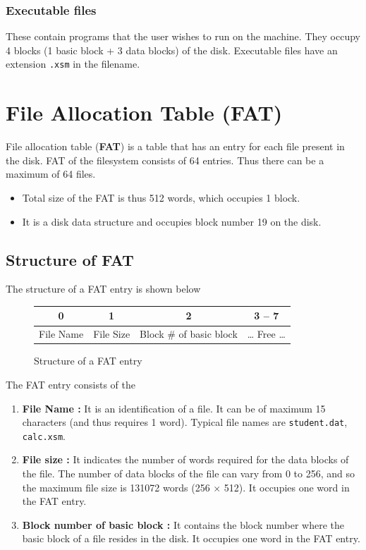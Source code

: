 \documentclass[11pt]{article}
\begin{document}
\subsubsection{Executable files}  These contain programs that the user wishes to run on the machine. They occupy 4 blocks (1 basic block + 3 data blocks) of the disk. Executable files have an extension \texttt{.xsm} in the filename.


\section{File Allocation Table (FAT)}
\label{sec:fat}
\label{lbl:fat}
File allocation table (\textbf{FAT}) is a table that has an entry for each file present in the disk. FAT of the filesystem consists of 64 entries. Thus there can be a maximum of 64 files.

\begin{itemize}
\item Total size of the FAT is thus 512 words, which occupies 1 block.
\item It is a disk data structure and occupies block number 19 on the disk.
\end{itemize}


\subsection{Structure of FAT}


The structure of a FAT entry is shown below 

\begin{figure}[htp!] \small
	\centering
	\begin{tabular}{|c|c|c|c|}
		\hline
		0 & 1 & 2 & 3 -- 7 \\
		\hline
		File Name & File Size & Block \# of basic block & \dots{} Free \dots \\
		\hline
	\end{tabular}
	\caption{Structure of a FAT entry}
	\label{fig:fat_entry}
\end{figure}

The FAT entry consists of the
\begin{enumerate}
	\item \textbf{File Name :} It is an identification of a file. It can be of maximum 15 characters (and thus requires 1 word). Typical file names are \texttt{student.dat}, \texttt{calc.xsm}.
	\item \textbf{File size :} It indicates the number of words required for the data blocks of the file. The number of data blocks of the file can vary from 0 to 256, and so the maximum file size is 131072 words (256 $\times$ 512). It occupies one word in the FAT entry.
	\item \textbf{Block number of basic block :} It contains the block number where the basic block of a file resides in the disk. It occupies one word in the FAT entry.
\end{enumerate}
\end{document}

